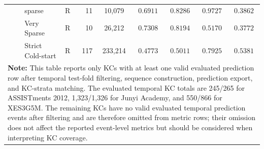 \begin{table}[htbp]
{\begin{tabular}{lllcrccccc}
 &  & sparse & R & 11 & 10,079 & $0.6911$ & $0.8286$ & $0.9727$ & $0.3862$ \\
 &  & Very Sparse & R & 10 & 26,212 & $0.7308$ & $0.8194$ & $0.5170$ & $0.3772$ \\
 &  & Strict Cold-start & R & 117 & 233,214 & $0.4773$ & $0.5011$ & $0.7925$ & $0.5381$ \\
\bottomrule
\multicolumn{10}{p{16.5cm}}{\scriptsize \textbf{Note:} This table reports only KCs with at least one valid evaluated prediction row after temporal test-fold filtering, sequence construction, prediction export, and KC-strata matching. The evaluated temporal KC totals are 245/265 for ASSISTments 2012, 1,323/1,326 for Junyi Academy, and 550/866 for XES3G5M. The remaining KCs have no valid evaluated temporal prediction events after filtering and are therefore omitted from metric rows; their omission does not affect the reported event-level metrics but should be considered when interpreting KC coverage.} \\
\end{tabular}%
}
\end{table}
